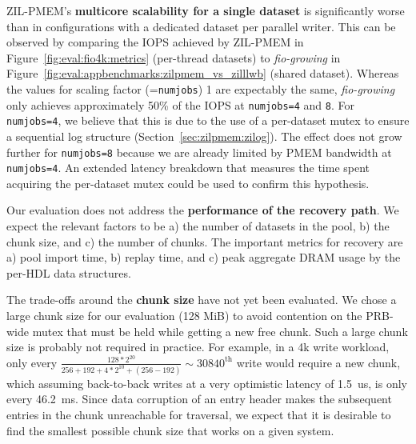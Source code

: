 \documentclass[12pt,a4paper,twoside]{book}
\begin{document}
{ZIL-PMEM's \textbf{multicore scalability for a single dataset} is significantly worse than in configurations with a dedicated dataset per parallel writer.
This can be observed by comparing the IOPS achieved by ZIL-PMEM in Figure~\ref{fig:eval:fio4k:metrics} (per-thread datasets) to \textit{fio-growing} in Figure~\ref{fig:eval:appbenchmarks:zilpmem_vs_zilllwb} (shared dataset).
Whereas the values for scaling factor (=\lstinline{numjobs}) 1 are expectably the same, \textit{fio-growing} only achieves approximately 50\% of the IOPS at \lstinline{numjobs=4} and \lstinline{8}.
For \lstinline{numjobs=4}, we believe that this is due to the use of a per-dataset mutex to ensure a sequential log structure (Section~\ref{sec:zilpmem:zilog}).
The effect does not grow further for \lstinline{numjobs=8} because we are already limited by PMEM bandwidth at \lstinline{numjobs=4}.
An extended latency breakdown that measures the time spent acquiring the per-dataset mutex could be used to confirm this hypothesis.

Our evaluation does not address the \textbf{performance of the recovery path}.
We expect the relevant factors to be a) the number of datasets in the pool, b) the chunk size, and c) the number of chunks.
The important metrics for recovery are a) pool import time, b) replay time, and c) peak aggregate DRAM usage by the per-HDL data structures.

The trade-offs around the \textbf{chunk size} have not yet been evaluated.
We chose a large chunk size for our evaluation (128 MiB) to avoid contention on the PRB-wide mutex that must be held while getting a new free chunk.
Such a large chunk size is probably not required in practice.
For example, in a 4k write workload, only every $\frac{128 * 2^{20}}{256 + 192 + 4*2^{10} + (256 - 192)} \sim 30840^\text{th}$ write would require a new chunk, which assuming back-to-back writes at a very optimistic latency of 1.5~us, is only every 46.2~ms.
Since data corruption of an entry header makes the subsequent entries in the chunk unreachable for traversal, we expect that it is desirable to find the smallest possible chunk size that works on a given system.

}
\end{document}
